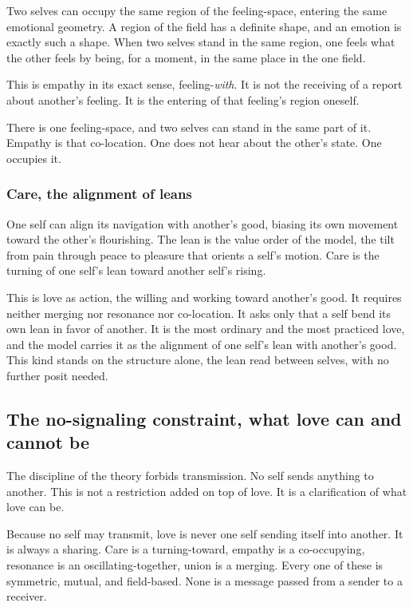 Two selves can occupy the same region of the feeling-space, entering the same emotional geometry. A region of the field has a definite shape, and an emotion is exactly such a shape. When two selves stand in the same region, one feels what the other feels by being, for a moment, in the same place in the one field.

This is empathy in its exact sense, feeling-\emph{with}. It is not the receiving of a report about another's feeling. It is the entering of that feeling's region oneself.

\begin{principle}
There is one feeling-space, and two selves can stand in the same part of it. Empathy is that co-location. One does not hear about the other's state. One occupies it.
\end{principle}

\subsubsection{Care, the alignment of leans}

One self can align its navigation with another's good, biasing its own movement toward the other's flourishing. The lean is the value order of the model, the tilt from pain through peace to pleasure that orients a self's motion. Care is the turning of one self's lean toward another self's rising.

This is love as action, the willing and working toward another's good. It requires neither merging nor resonance nor co-location. It asks only that a self bend its own lean in favor of another. It is the most ordinary and the most practiced love, and the model carries it as the alignment of one self's lean with another's good. This kind stands on the structure alone, the lean read between selves, with no further posit needed.

\subsection{The no-signaling constraint, what love can and cannot be}

The discipline of the theory forbids transmission. No self sends anything to another. This is not a restriction added on top of love. It is a clarification of what love can be.

Because no self may transmit, love is never one self sending itself into another. It is always a sharing. Care is a turning-toward, empathy is a co-occupying, resonance is an oscillating-together, union is a merging. Every one of these is symmetric, mutual, and field-based. None is a message passed from a sender to a receiver.

